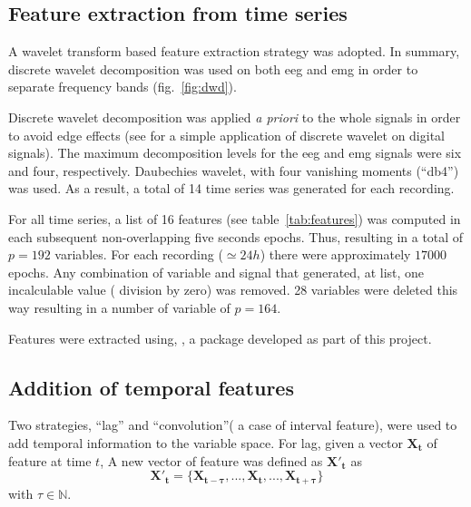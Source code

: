 \subsection{Feature extraction from time series}
\label{sub:features}

A wavelet transform based feature extraction strategy was adopted.
In summary, discrete wavelet decomposition was used on both \gls{eeg} and \gls{emg}
in order to separate frequency bands (fig.~\ref{fig:dwd}).



Discrete wavelet decomposition was applied \emph{a priori} to the whole signals
in order to avoid edge effects (see \cite{prabhakar_application_2002} for a
simple application of discrete wavelet on digital signals).
The maximum decomposition levels for the \gls{eeg} and \gls{emg} signals were six and four, respectively.
Daubechies wavelet, with four vanishing moments (``db4'') was used.
As a result, a total of 14 time series was generated for each recording.

For all time series, a list of 16 features (see table~\ref{tab:features}) was computed in each subsequent non-overlapping five seconds epochs.
Thus, resulting in a total of $p=192$ variables. 
For each recording ($\simeq 24h$) there were approximately $17000$ epochs.
Any combination of variable and signal that generated, at list, one incalculable value (\eg{} division by zero) was removed.
28 variables were deleted this way resulting in a number of variable of $p=164$.



Features were extracted using, \pr{}, a \py{} package developed as part of this project.


\subsection{Addition of temporal features}
Two strategies, ``lag'' and ``convolution''(\ie{} a case of interval feature\cite{rodriguez_support_2005}), were used to add temporal
information to the variable space\cite{dietterich_machine_2002}.
For lag, given a vector $\mathbf{X_t}$ of feature at time $t$,
A new vector of feature was defined as $\mathbf{{X'}_t}$ as
\begin{equation}
\mathbf{{X'}_t} = \{\mathbf{X_{t-\tau}}, ..., \mathbf{X_t}, ..., \mathbf{X_{t+\tau}}\}
\label{eq:tau}
\end{equation}
with $\tau \in \mathbb{N}$.


